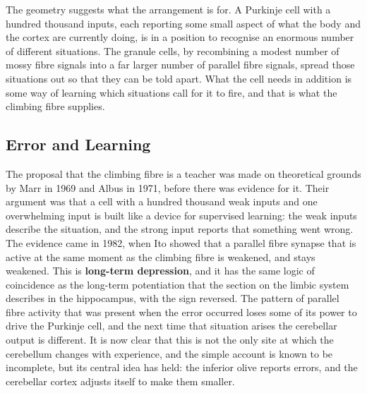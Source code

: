 \documentclass[11pt]{article}
\begin{document}
The geometry suggests what the arrangement is for. A Purkinje cell with a hundred thousand inputs, each reporting some small aspect of what the body and the cortex are currently doing, is in a position to recognise an enormous number of different situations. The granule cells, by recombining a modest number of mossy fibre signals into a far larger number of parallel fibre signals, spread those situations out so that they can be told apart. What the cell needs in addition is some way of learning which situations call for it to fire, and that is what the climbing fibre supplies.

\subsection{Error and Learning}

The proposal that the climbing fibre is a teacher was made on theoretical grounds by Marr in 1969 and Albus in 1971, before there was evidence for it. Their argument was that a cell with a hundred thousand weak inputs and one overwhelming input is built like a device for supervised learning: the weak inputs describe the situation, and the strong input reports that something went wrong. The evidence came in 1982, when Ito showed that a parallel fibre synapse that is active at the same moment as the climbing fibre is weakened, and stays weakened. This is \textbf{long-term depression}, and it has the same logic of coincidence as the long-term potentiation that the section on the limbic system describes in the hippocampus, with the sign reversed. The pattern of parallel fibre activity that was present when the error occurred loses some of its power to drive the Purkinje cell, and the next time that situation arises the cerebellar output is different. It is now clear that this is not the only site at which the cerebellum changes with experience, and the simple account is known to be incomplete, but its central idea has held: the inferior olive reports errors, and the cerebellar cortex adjusts itself to make them smaller.
\end{document}
